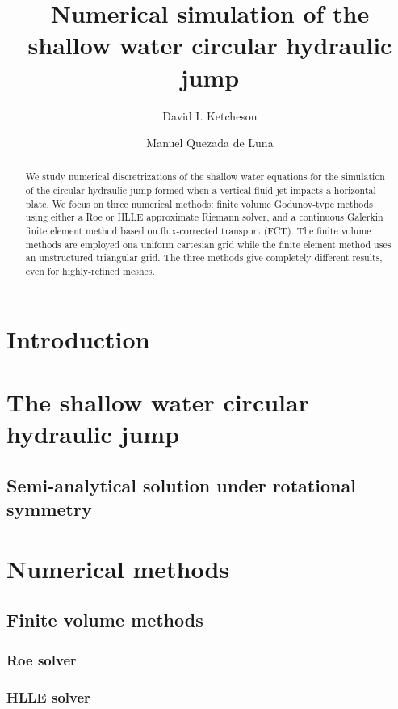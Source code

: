 \documentclass{article}
\title{Numerical simulation of the shallow water circular hydraulic jump}
\author{
    David I. Ketcheson \and
    Manuel Quezada de Luna
}
\begin{document}
\maketitle

\begin{abstract}
We study numerical discretrizations of the shallow water equations
for the simulation of the circular hydraulic jump formed
when a vertical fluid jet impacts a horizontal plate.  
We focus on three numerical methods: finite volume Godunov-type
methods using either a Roe or HLLE approximate Riemann solver, and
a continuous Galerkin finite element method based on flux-corrected transport (FCT).
The finite volume methods are employed ona uniform cartesian grid
while the finite element method uses an unstructured triangular grid.
The three methods give completely different results, even for
highly-refined meshes.
\end{abstract}


\section{Introduction}

\section{The shallow water circular hydraulic jump}

\subsection{Semi-analytical solution under rotational symmetry}

\section{Numerical methods}

\subsection{Finite volume methods}

\subsubsection{Roe solver}

\subsubsection{HLLE solver}
\end{document}
